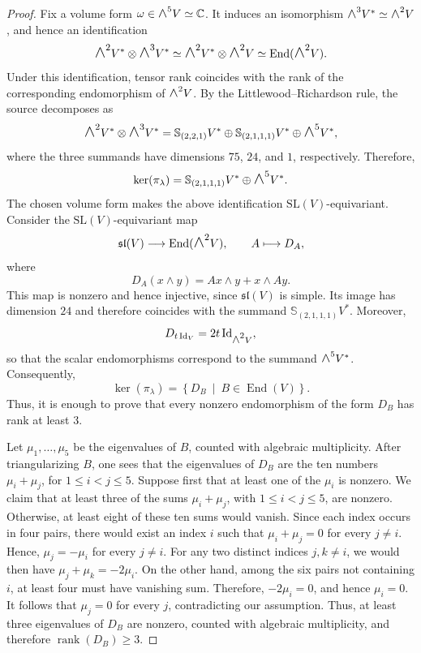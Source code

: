 \documentclass[a4paper,reqno]{amsart}
\theoremstyle{plainnopunct}
\theoremstyle{definitionnopunct}
\newcommand{\superwedge}{\mathlarger{\mathlarger{\wedge}}}
\newcommand{\C}{\mathbb{C}}
\renewcommand{\S}{\mathbb{S}}
\newcommand{\SL}{\mathrm{SL}}
\newcommand{\Lie}{\mathfrak}
\newcommand{\rank}{\operatorname{rank}}
\begin{document}
\begin{proof}
Fix a volume form $\omega\in \superwedge^5V\simeq\C$. It induces an isomorphism $\superwedge^3V^*\simeq\superwedge^2V$, and hence an identification
\[
\superwedge^2V^*\otimes\superwedge^3V^*\simeq\superwedge^2V^*\otimes\superwedge^2V\simeq\operatorname{End}(\superwedge^2V).
\]
Under this identification, tensor rank coincides with the rank of the corresponding endomorphism of $\superwedge^2V$. By the Littlewood--Richardson rule, the source decomposes as
\[
\superwedge^2V^*\otimes\superwedge^3V^*=\S_{(2,2,1)}V^*\oplus\S_{(2,1,1,1)}V^*\oplus\superwedge^5V^*,
\]
where the three summands have dimensions $75$, $24$, and $1$, respectively. Therefore,
\[
\ker(\pi_\lambda)=\S_{(2,1,1,1)}V^*\oplus\superwedge^5V^*.
\]
The chosen volume form makes the above identification
$\SL(V)$-equivariant. Consider the $\SL(V)$-equivariant map
\[
\Lie{sl}(V)
\longrightarrow
\operatorname{End}(\superwedge^2V),
\qquad
A\longmapsto D_A,
\]
where
\[
D_A(x\wedge y)
=
Ax\wedge y+x\wedge Ay.
\]
This map is nonzero and hence injective, since
$\Lie{sl}(V)$ is simple. Its image has dimension $24$ and therefore
coincides with the summand $\S_{(2,1,1,1)}V^*$.
Moreover,
\[
D_{t\operatorname{Id}_V}
=
2t\operatorname{Id}_{\superwedge^2V},
\]
so that the scalar endomorphisms correspond to the summand
$\superwedge^5V^*$. Consequently,
\[
\ker(\pi_\lambda)
=
\left\{
D_B
\ \middle|\
B\in\operatorname{End}(V)
\right\}.
\]
Thus, it is enough to prove that every nonzero endomorphism of the
form $D_B$ has rank at least $3$.



Let $\mu_1,\dots,\mu_5$ be the eigenvalues of $B$, counted with algebraic multiplicity. After triangularizing $B$, one sees that the eigenvalues of $D_B$
are the ten numbers $\mu_i+\mu_j$, for $1\leq i<j\leq5$. Suppose first that at least one of the $\mu_i$ is nonzero. We claim that at least three of the sums $\mu_i+\mu_j$, with $1\leq i<j\leq5$, are nonzero. Otherwise, at least eight of these ten sums would vanish. Since each index occurs in four pairs, there would exist an index $i$ such that $\mu_i+\mu_j=0$ for every $j\neq i$. Hence, $\mu_j=-\mu_i$ for every $j\neq i$. For any two distinct indices $j,k\neq i$, we would then have $\mu_j+\mu_k=-2\mu_i$. On the other hand, among the six pairs not containing $i$, at least four must have vanishing sum. Therefore, $-2\mu_i=0$, and hence $\mu_i=0$. It follows that $\mu_j=0$ for every $j$, contradicting our assumption. Thus, at least three eigenvalues of $D_B$ are nonzero, counted with algebraic multiplicity, and therefore $\rank(D_B)\geq3$.


\end{proof}
\end{document}
